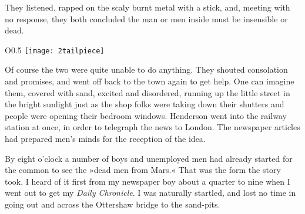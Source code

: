 They listened, rapped on the scaly burnt metal with a stick, and, meeting with no response, they both concluded the man or men inside must be insensible or dead.

\begin{wrapfigure}{O}{0.5\textwidth}
\centering
\texttt{[image: 2tailpiece]}
\end{wrapfigure}

Of course the two were quite unable to do anything. They shouted consolation and promises, and went off back to the town again to get help. One can imagine them, covered with sand, excited and disordered, running up the little street in the bright sunlight just as the shop folks were taking down their shutters and people were opening their bedroom windows. Henderson went into the railway station at once, in order to telegraph the news to London. The newspaper articles had prepared men's minds for the reception of the idea.

By eight o'clock a number of boys and unemployed men had already started for the common to see the »dead men from Mars.« That was the form the story took. I heard of it first from my newspaper boy about a quarter to nine when I went out to get my \textit{Daily Chronicle}. I was naturally startled, and lost no time in going out and across the Ottershaw bridge to the sand-pits.

